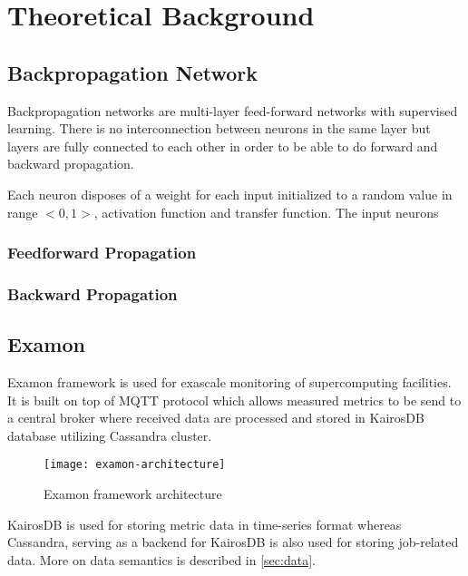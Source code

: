 \section{Theoretical Background}
\label{sec:theory}

\subsection{Backpropagation Network}
Backpropagation networks are multi-layer feed-forward networks with supervised learning. There is no interconnection between neurons in the same layer but layers are fully connected to each other in order to be able to do forward and backward propagation.

Each neuron disposes of a weight for each input initialized to a random value in range $<0,1>$, activation function and transfer function. The input neurons 
\subsubsection{Feedforward Propagation}
\subsubsection{Backward Propagation}


\subsection{Examon}
\label{sec:examon}
Examon framework is used for exascale monitoring of supercomputing facilities. It is built on top of MQTT protocol\cite{locke2010mqtt} which allows measured metrics to be send to a central broker where received data are processed and stored in KairosDB\cite{KAIROS} database utilizing Cassandra\cite{CASSANDRA} cluster.

\begin{figure}[ht]
    \centering
    \texttt{[image: examon-architecture]}
    \caption{Examon framework architecture}
    \label{arch}
\end{figure}

KairosDB is used for storing metric data in time-series format whereas Cassandra, serving as a backend for KairosDB is also used for storing job-related data. More on data semantics is described in \ref{sec:data}.

